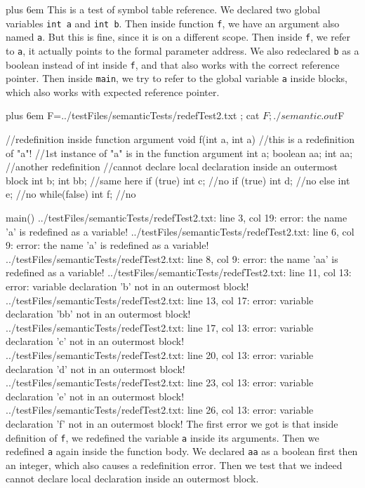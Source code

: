 \documentclass{article}
\makeatletter
\newenvironment{myverb}
 {\def\@xobeysp{\ }\verbatim\rightskip=0pt plus 6em\relax}
 {\endverbatim}
\makeatother
\begin{document}
\begin{itemize}
\begin{myverb}
\end{myverb}
This is a test of symbol table reference. We declared two global variables \verb|int a| and \verb|int b|. Then inside function \verb|f|, we have an argument also named \verb|a|. But this is fine, since it is on a different scope. Then inside \verb|f|, we refer to \verb|a|, it actually points to the formal parameter address. We also redeclared \verb|b| as a boolean instead of int inside \verb|f|, and that also works with the correct reference pointer. Then inside \verb|main|, we try to refer to the global variable \verb|a| inside blocks, which also works with expected reference pointer.

\begin{myverb}
 F=../testFiles/semanticTests/redefTest2.txt ; cat $F; ./semantic.out $F

//redefinition inside function argument
void f(int a, int a){
    //this is a redefinition of "a"!
    //1st instance of "a" is in the function argument
    int a;
    boolean aa;
    int aa; //another redefinition
    {
        //cannot declare local declaration inside an outermost block
        int b;
        {
            int bb; //same here
        }
    }
    if (true){
        int c; //no
    }
    if (true){
        int d; //no
    }
    else{
        int e; //no
    }
    while(false){
        int f; //no
    }
}

main(){
}
../testFiles/semanticTests/redefTest2.txt: line 3, col 19: error: the name 'a' is redefined as a variable!
../testFiles/semanticTests/redefTest2.txt: line 6, col 9: error: the name 'a' is redefined as a variable!
../testFiles/semanticTests/redefTest2.txt: line 8, col 9: error: the name 'aa' is redefined as a variable!
../testFiles/semanticTests/redefTest2.txt: line 11, col 13: error: variable declaration 'b' not in an outermost block!
../testFiles/semanticTests/redefTest2.txt: line 13, col 17: error: variable declaration 'bb' not in an outermost block!
../testFiles/semanticTests/redefTest2.txt: line 17, col 13: error: variable declaration 'c' not in an outermost block!
../testFiles/semanticTests/redefTest2.txt: line 20, col 13: error: variable declaration 'd' not in an outermost block!
../testFiles/semanticTests/redefTest2.txt: line 23, col 13: error: variable declaration 'e' not in an outermost block!
../testFiles/semanticTests/redefTest2.txt: line 26, col 13: error: variable declaration 'f' not in an outermost block!
\end{myverb}
The first error we got is that inside definition of \verb|f|, we redefined the variable \verb|a| inside its arguments. Then we redefined \verb|a| again inside the function body. We declared \verb|aa| as a boolean first then an integer, which also causes a redefinition error. Then we test that we indeed cannot declare local declaration inside an outermost block. 


\end{itemize}
\end{document}
